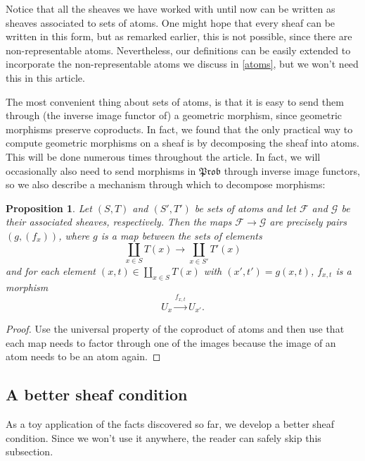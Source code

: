 \documentclass[a4paper]{amsproc}
\theoremstyle{plain}
\newtheorem{proposition}[theorem]{Proposition}
\theoremstyle{definition}
\theoremstyle{remark}
\numberwithin{equation}{section}
\newcommand{\Prob}{\mathfrak{Prob}}
\begin{document}
Notice that all the sheaves we have worked with until now can be written as sheaves associated to sets of atoms. One might hope that every sheaf can be written in this form, but as remarked earlier, this is not possible, since there are non-representable atoms. Nevertheless, our definitions can be easily extended to incorporate the non-representable atoms we discuss in \ref{atoms}, but we won't need this in this article.

The most convenient thing about sets of atoms, is that it is easy to send them through (the inverse image functor of) a geometric morphism, since geometric morphisms preserve coproducts. In fact, we found that the only practical way to compute geometric morphisms on a sheaf is by decomposing the sheaf into atoms. This will be done numerous times throughout the article. In fact, we will occasionally also need to send morphisms in $\Prob$ through inverse image functors, so we also describe a mechanism through which to decompose morphisms:

\begin{proposition}\label{atom_coprod_maps}
    Let $(S,T)$ and $(S',T')$ be sets of atoms and let $\mathcal{F}$ and $\mathcal{G}$ be their associated sheaves, respectively. Then the maps $\mathcal{F} \to \mathcal{G}$ are precisely pairs $(g, (f_x))$, where $g$ is a map between the sets of elements
    \[
        \coprod_{x \in S} T(x) \to \coprod_{x \in S'} T'(x)
    \]
    and for each element $(x,t) \in \coprod_{x \in S} T(x)$ with $(x',t') = g(x,t)$, $f_{x,t}$ is a morphism
    \[
        U_x \xrightarrow{f_{x,t}} U_{x'} .
    \]
\end{proposition}
\begin{proof}
    Use the universal property of the coproduct of atoms and then use that each map needs to factor through one of the images because the image of an atom needs to be an atom again.
\end{proof}

\subsection{A better sheaf condition}

As a toy application of the facts discovered so far, we develop a better sheaf condition. Since we won't use it anywhere, the reader can safely skip this subsection.
\end{document}
